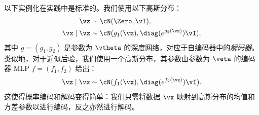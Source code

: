 \documentclass[../../book-main_zh.tex]{subfiles}
\begin{document}
以下实例化在实践中是标准的。我们使用以下高斯分布：
\begin{align*}
    \vz &\sim \cN(\Zero, \vI), \\
    \vx \mid \vz &\sim \cN(g_1(\vz), \diag(e^{g_2(\vz)}) \vI),
\end{align*}
其中 $g = (g_1, g_2)$ 是参数为 $\vtheta$ 的深度网络，对应于自编码器中的\textit{解码器}。
类似地，对于近似后验，我们使用一个高斯分布，其参数由参数为 $\veta$ 的编码器
MLP $f = (f_1, f_2)$ 给出：
\begin{equation*}
    \vz \mid \vx \sim \cN(f_1(\vx), \diag(e^{f_2(\vx)}) \vI).
\end{equation*}
这使得概率编码和解码变得简单：我们只需将数据 $\vx$ 映射到高斯分布的均值和方差参数以进行编码，反之亦然进行解码。
\end{document}
